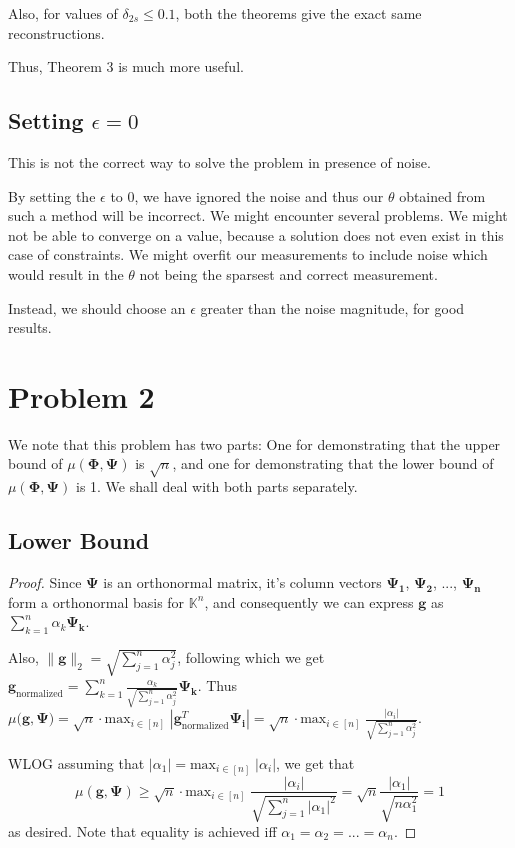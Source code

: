 \documentclass[a4paper,11pt]{article}
\numberwithin{definition}{section}
\numberwithin{mytheorem}{subsection}
\begin{document}
Also, for values of $\delta_{2s} \leq 0.1$, both the theorems give the exact same reconstructions.

Thus, Theorem 3 is much more useful.


\subsection{Setting $\epsilon = 0$}

This is not the correct way to solve the problem in presence of noise.

By setting the $\epsilon$ to 0, we have ignored the noise and thus our $\theta$ obtained from such a method will be incorrect. We might encounter several problems. We might not be able to converge on a value, because a solution does not even exist in this case of constraints. We might overfit our measurements to include noise which would result in the $\theta$ not being the sparsest and correct measurement.

Instead, we should choose an $\epsilon$ greater than the noise magnitude, for good results.



\newpage


\section{Problem 2}
We note that this problem has two parts: One for demonstrating that the upper bound of $\mu(\boldsymbol{\Phi, \Psi})$ is $\sqrt{n}$, and one for demonstrating that the lower bound of $\mu(\boldsymbol{\Phi, \Psi})$ is 1. We shall deal with both parts separately.

\subsection{Lower Bound}
\begin{proof}
Since $\boldsymbol{\Psi}$ is an orthonormal matrix, it's column vectors $\boldsymbol{\Psi_1}$, $\boldsymbol{\Psi_2}$, ..., $\boldsymbol{\Psi_n}$ form a orthonormal basis for $\mathbb{K}^n$, and consequently we can express $\boldsymbol{g}$ as $\sum_{k=1}^{n} \alpha_k\boldsymbol{\Psi_k}$.

Also, $\lVert \boldsymbol{g}\rVert_2 = \sqrt{\sum_{j=1}^{n} \alpha^2_j}$, following which we get $\boldsymbol{g}_{\mathrm{normalized}} = \sum_{k=1}^{n} \frac{\alpha_k}{\sqrt{\sum_{j=1}^{n} \alpha^2_j}}\boldsymbol{\Psi_k}$. Thus $\mu(\boldsymbol{g, \Psi)} = \sqrt{n}\cdot\mathrm{max}_{i\in[n]}\;|\boldsymbol{g}_{\mathrm{normalized}}^T\boldsymbol{\Psi_i}| = \sqrt{n}\cdot\mathrm{max}_{i\in[n]}\;\frac{|\alpha_i|}{\sqrt{\sum_{j=1}^{n} \alpha^2_j}}$.

WLOG assuming that $|\alpha_1| = \mathrm{max}_{i\in[n]}\;|\alpha_i|$, we get that
$$\mu(\boldsymbol{g, \Psi}) \geq \sqrt{n}\cdot\mathrm{max}_{i\in[n]}\;\frac{|\alpha_i|}{\sqrt{\sum_{j=1}^{n} |\alpha_1|^2}} = \sqrt{n}\frac{|\alpha_1|}{\sqrt{n\alpha^2_1}} = 1$$
as desired. Note that equality is achieved iff $\alpha_1 = \alpha_2 = ... = \alpha_n$.
\end{proof}
\end{document}
